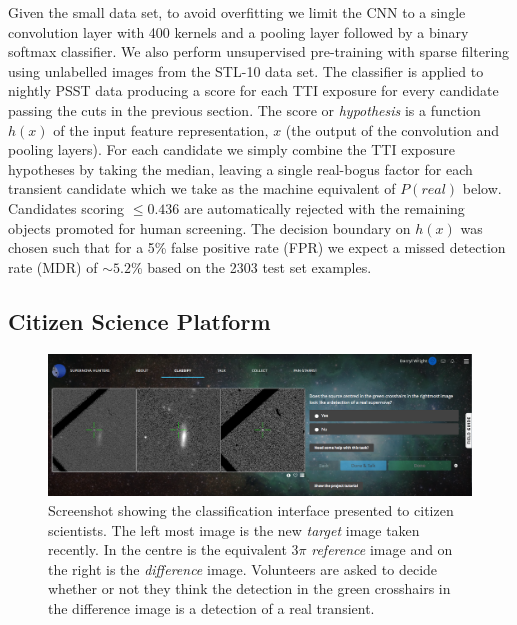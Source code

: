 \documentclass[a4paper,fleqn,usenatbib]{mnras}
\begin{document}
Given the small data set, to avoid overfitting we limit the CNN to a single convolution layer with 400 kernels and a pooling layer followed by a binary softmax classifier.  We also perform unsupervised pre-training with sparse filtering \citet{Ngiam11} using unlabelled images from the STL-10 \citep{Coates11} data set.  The classifier is applied to nightly PSST data producing a score for each TTI exposure for every candidate passing the cuts in the previous section.  The score or \textit{hypothesis} is a function $h(x)$ of the input feature representation, $x$ (the output of the convolution and pooling layers).  For each candidate we simply combine the TTI exposure hypotheses by taking the median, leaving a single real-bogus factor for each transient candidate which we take as the machine equivalent of $P(real)$ below.  Candidates scoring $\leq 0.436$ are automatically rejected with the remaining objects promoted for human screening.  The decision boundary on $h(x)$ was chosen such that for a 5\% false positive rate (FPR) we expect a missed detection rate (MDR) of $\sim5.2$\% based on
the 2303 test set examples.

\subsection{Citizen Science Platform}


\begin{figure}
   \begin{minipage}{140mm}
   \includegraphics[width=140mm]{figs/sn_hunters.png}
   \caption{Screenshot showing the classification interface presented to citizen scientists.  The left most image is the new \textit{target} image taken recently.  In the centre is the equivalent $3\pi$ \textit{reference} image and on the right is the \textit{difference} image.  Volunteers are asked to decide whether or not they think the detection in the green crosshairs in the difference image is a
detection of a real transient.} 
   \label{fig:sn_hunters}
   \end{minipage}
\end{figure}
\end{document}
